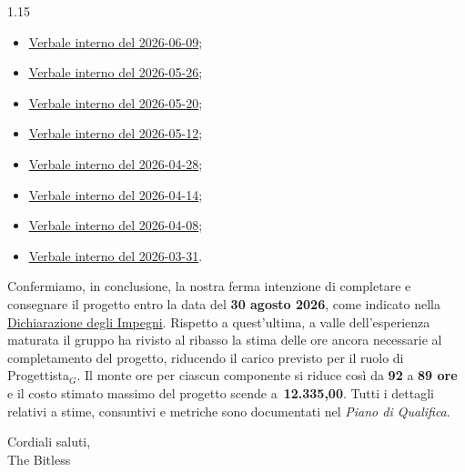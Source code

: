\documentclass[a4paper, 11pt]{article}
\let\orighref\href
\renewcommand{\href}[2]{\orighref{#1}{\uline{#2}}}
\begin{document}
\begin{spacing}{1.15}
\begin{itemize}
\begin{itemize}
        \item \href{https://thebitless.live/RTB/doc_interna/verbali/VI_2026-06-09_sesto-sprint/VI_2026-06-09_sesto-sprint.pdf}{Verbale interno del 2026-06-09};
        \item \href{https://thebitless.live/RTB/doc_interna/verbali/V_2026-05-26_quinto-sprint/V_2026-05-26_quinto-sprint.pdf}{Verbale interno del 2026-05-26};
        \item \href{https://thebitless.live/RTB/doc_interna/verbali/VI_2026-05-20_progettazione-PoC/VI_2026-05-20_progettazione-PoC.pdf}{Verbale interno del 2026-05-20};
        \item \href{https://thebitless.live/RTB/doc_interna/verbali/VI_2026-05-12_quarto-sprint/VI_2026-05-12_quarto-sprint.pdf}{Verbale interno del 2026-05-12};
        \item \href{https://thebitless.live/RTB/doc_interna/verbali/VI_2026-04-28_terzo-sprint/VI_2026-04-28_terzo-sprint.pdf}{Verbale interno del 2026-04-28};
        \item \href{https://thebitless.live/RTB/doc_interna/verbali/VI_2026-04-14_secondo-sprint/VI_2026-04-14_secondo-sprint.pdf}{Verbale interno del 2026-04-14};
        \item \href{https://thebitless.live/RTB/doc_interna/verbali/VI_2026-04-08_casi-uso/VI_2026-04-08_casi-uso.pdf}{Verbale interno del 2026-04-08};
        \item \href{https://thebitless.live/RTB/doc_interna/verbali/VI_2026-03-31_post-aggiudicazione/VI_2026-03-31_post-aggiudicazione.pdf}{Verbale interno del 2026-03-31}.
    \end{itemize}
\end{itemize}

\vspace{0.2cm}

\noindent Confermiamo, in conclusione, la nostra ferma intenzione di completare e consegnare il progetto entro la data del \textbf{30 agosto 2026}, come indicato nella \href{https://thebitless.live/candidatura/dichiarazione-degli-impegni/dichiarazione-degli-impegni.pdf}{Dichiarazione degli Impegni}. Rispetto a quest'ultima, a valle dell'esperienza maturata il gruppo ha rivisto al ribasso la stima delle ore ancora necessarie al completamento del progetto, riducendo il carico previsto per il ruolo di Progettista$_G$. Il monte ore per ciascun componente si riduce così da \textbf{92} a \textbf{89 ore} e il costo stimato massimo del progetto scende a \textbf{\texteuro\,12.335,00}. Tutti i dettagli relativi a stime, consuntivi e metriche sono documentati nel \textit{Piano di Qualifica}.

\vspace{0.8cm}

\noindent Cordiali saluti, \\
The Bitless

\end{spacing}
\end{document}
